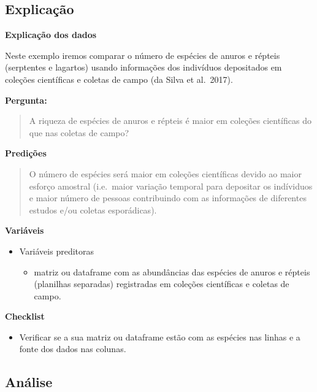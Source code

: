 \documentclass[
]{book}
\providecommand{\tightlist}{%
  \setlength{\itemsep}{0pt}\setlength{\parskip}{0pt}}
\begin{document}
\hypertarget{explicauxe7uxe3o-1}{%
\subsection{Explicação}\label{explicauxe7uxe3o-1}}

\textbf{Explicação dos dados}

Neste exemplo iremos comparar o número de espécies de anuros e répteis (serptentes e lagartos) usando informações dos indivíduos depositados em coleções científicas e coletas de campo (da Silva et al.~2017).

\textbf{Pergunta:}

\begin{quote}
A riqueza de espécies de anuros e répteis é maior em coleções científicas do que nas coletas de campo?
\end{quote}

\textbf{Predições}

\begin{quote}
O número de espécies será maior em coleções científicas devido ao maior esforço amostral (i.e.~maior variação temporal para depositar os indíviduos e maior número de pessoas contribuindo com as informações de diferentes estudos e/ou coletas esporádicas).
\end{quote}

\textbf{Variáveis}

\begin{itemize}
\tightlist
\item
  Variáveis preditoras

  \begin{itemize}
  \tightlist
  \item
    matriz ou dataframe com as abundâncias das espécies de anuros e répteis (planilhas separadas) registradas em coleções científicas e coletas de campo.
  \end{itemize}
\end{itemize}

\textbf{Checklist}

\begin{itemize}
\tightlist
\item
  Verificar se a sua matriz ou dataframe estão com as espécies nas linhas e a fonte dos dados nas colunas.
\end{itemize}

\hypertarget{anuxe1lise-1}{%
\subsection{Análise}\label{anuxe1lise-1}}
\end{document}
